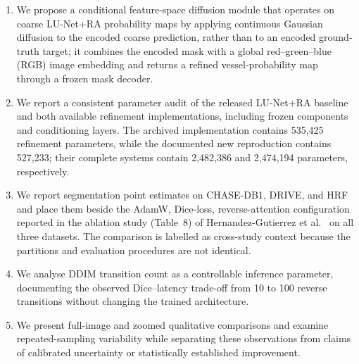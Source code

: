 \documentclass[jimaging,article,submit,pdftex,moreauthors]
  {Definitions/mdpi}
\begin{document}
\begin{enumerate}

  \item We propose a conditional feature-space diffusion module that operates on
coarse LU-Net+RA probability maps by applying continuous Gaussian diffusion to
the encoded coarse prediction, rather than to an encoded ground-truth target;
it combines the encoded mask with a global red--green--blue (RGB) image
embedding and returns a refined vessel-probability map through a frozen mask
decoder.

  \item We report a consistent parameter audit of the released LU-Net+RA baseline and both available refinement implementations, including frozen components and conditioning layers. The archived implementation contains 535,425 refinement parameters, while the documented new reproduction contains 527,233; their complete systems contain 2,482,386 and 2,474,194 parameters, respectively.

  \item We report segmentation point estimates on CHASE-DB1, DRIVE, and HRF and
place them beside the AdamW, Dice-loss, reverse-attention configuration reported
in the ablation study (Table~8) of Hernandez-Gutierrez et al.~\cite{Hernandez2025}
on all three datasets. The comparison is labelled as cross-study context because
the partitions and evaluation procedures are not identical.

  \item We analyse DDIM transition count as a controllable inference parameter, documenting the observed Dice--latency trade-off from 10 to 100 reverse transitions without changing the trained architecture.

  \item We present full-image and zoomed qualitative comparisons and examine repeated-sampling variability while separating these observations from claims of calibrated uncertainty or statistically established improvement.
\end{enumerate}
\end{document}
